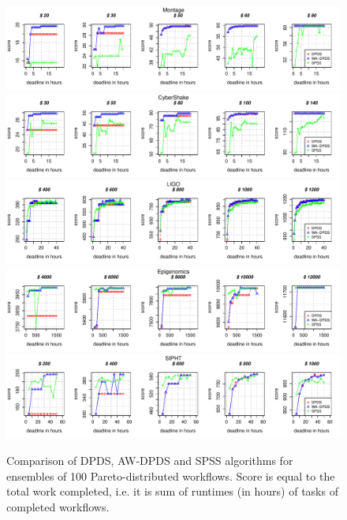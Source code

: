 \documentclass{sig-alternate}
\begin{document}
\begin{figure}[htb] 
\centering
\includegraphics[width=1.0\textwidth]{figures/size-MONTAGE-n-1000-8-dagh1-20m0.pdf}
\includegraphics[width=1.0\textwidth]{figures/size-CYBERSHAKE-n-1000-8-dagh1-20m0.pdf}
\includegraphics[width=1.0\textwidth]{figures/size-LIGO-n-1000-8-dagh1-40m0.pdf}
\includegraphics[width=1.0\textwidth]{figures/size-GENOME-n-1000-8-dagh100-1500m0.pdf}
\includegraphics[width=1.0\textwidth]{figures/size-SIPHT-n-1000-8-dagh5-50m0.pdf}
\caption{Comparison of DPDS, AW-DPDS and SPSS algorithms for ensembles of 100
Pareto-distributed workflows. Score is equal to the total work completed,
i.e. it is sum of runtimes (in hours) of tasks of completed workflows.}
\label{fig:}
\end{figure}
\end{document}

